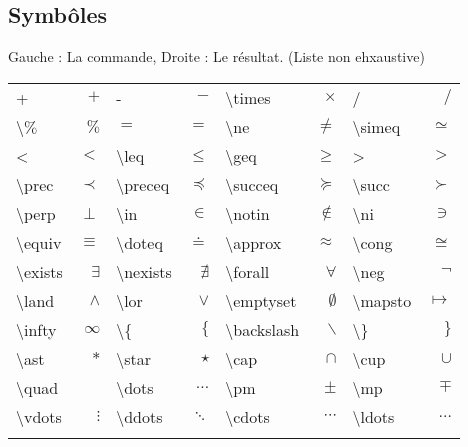     \subsection{Symbôles}
        Gauche : La commande, Droite : Le résultat. (Liste non ehxaustive)
        \begin{center}
            \begin{tabular}{ l r | l r | l r | l r}
                + & $+$ & - & ${-}$ & \textbackslash times & $\times$ & / & $/$ \\
                \textbackslash$\%$ & $\%$ & $=$ & $=$ & \textbackslash ne & $\ne$ & \textbackslash simeq & $\simeq$ \\
                < & $<$ & \textbackslash leq & $\leq$ & \textbackslash geq & $\geq$ & > & $>$ \\
                \textbackslash prec & $\prec$ & \textbackslash preceq & $\preceq$ & \textbackslash succeq & $\succeq$ & \textbackslash succ & $\succ$ \\
                \textbackslash perp & $\perp$ & \textbackslash in & $\in$ & \textbackslash notin & $\notin$ & \textbackslash ni & $\ni$ \\
                \textbackslash equiv & $\equiv$ & \textbackslash doteq & $\doteq$ & \textbackslash approx & $\approx$ & \textbackslash cong & $\cong$ \\
                \textbackslash exists & $\exists$ & \textbackslash nexists & $\nexists$ & \textbackslash forall & $\forall$ & \textbackslash neg & $\neg$ \\
                \textbackslash land & $\land$ & \textbackslash lor & $\lor$ & \textbackslash emptyset & $\emptyset$ & \textbackslash mapsto & $\mapsto$ \\
                \textbackslash infty & $\infty$ & \textbackslash \{ & $\{$ & \textbackslash backslash & $\backslash$ & \textbackslash \} & $\}$ \\
                \textbackslash ast & $\ast$ & \textbackslash star & $\star$ & \textbackslash cap & $\cap$ & \textbackslash cup & $\cup$ \\
                \textbackslash quad & $\quad$ & \textbackslash dots & $\dots$ & \textbackslash pm & $\pm$ & \textbackslash mp & $\mp$ \\
                \textbackslash vdots & $\vdots$ & \textbackslash ddots & $\ddots$ & \textbackslash cdots & $\cdots$ & \textbackslash ldots & $\ldots$ \\ \\
            \end{tabular}


\end{center}
